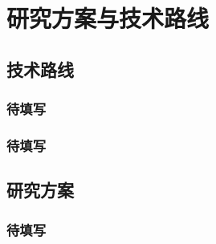 \chapter{研究方案与技术路线}
\section{技术路线}
\subsection{待填写}
\placeholder
\subsection{待填写}
\placeholder
\section{研究方案}
\subsection{待填写}
\placeholder
